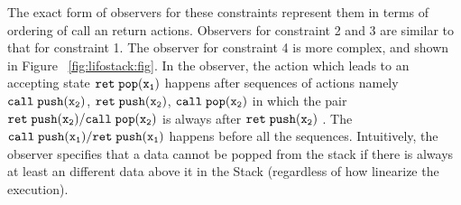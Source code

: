 The exact form of observers for these constraints represent them in
terms of ordering of call an return actions. Observers for constraint
2 and 3 are similar to that for constraint 1. The observer for constraint
4 is more complex, and shown in Figure ~\ref{fig:lifostack:fig}. In the observer, the action which leads to an accepting state $\tt ret \; pop(x_1)$ happens after sequences of actions namely $\tt call \; push(x_2)$, $\tt ret \; push(x_2)$, $\tt call \; pop(x_2)$ in which the pair $\tt ret \; push(x_2) / call \; pop(x_2)$ is always after $\tt ret \; push(x_2)$ . The $\tt call \; push(x_1)/ret \;push(x_1)$ happens before all the sequences. Intuitively, the observer specifies that a data cannot be popped from the stack if there is always at least an different data above it in the Stack (regardless of how linearize the execution). 
